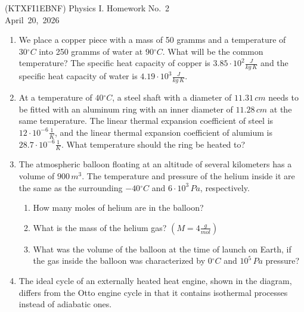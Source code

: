 \documentclass[a4paper,12pt]{letter}
\begin{document}
\begin{center}
 (KTXFI1EBNF) Physics I.  Homework No.~2\\ \smallskip
April~20,~2026
 \end{center}

\begin{enumerate}

\item We place a copper piece with a mass of 50 gramms and a temperature of $30{}^{\circ}C$ into 250 gramms of water at $90{}^{\circ}C$. What will be the common temperature? The specific heat capacity of copper is $3.85 \cdot 10^{2}\frac{J}{kg\,K}$ and the specific heat capacity of water is $4.19 \cdot 10^{3}\frac{J}{kg\,K}$.

\item At a temperature of $40{}^{\circ}C$, a steel shaft with a diameter of $11.31\,cm$ needs to be fitted with an aluminum ring with an inner diameter of $11.28\,cm$ at the same temperature. The linear thermal expansion coefficient of steel is $12 \cdot 10^{-6}\frac{1}{K}$, and the linear thermal expansion coefficient of alumium is $28.7 \cdot 10^{-6}\frac{1}{K}$. What temperature should the ring be heated to?


\item The atmospheric balloon floating at an altitude of several kilometers has a volume of $900\,m^{3}$. The temperature and pressure of the helium inside it are the same as the surrounding $-40{}^{\circ}C$ and $6 \cdot 10^{3}\,Pa$, respectively.
\begin{enumerate}
\item[(a)] How many moles of helium are in the balloon?
\item[(b)] What is the mass of the helium gas? $\left(M = 4 \frac{g}{mol}\right)$
\item[(c)] What was the volume of the balloon at the time of launch on Earth, if the gas inside the balloon was characterized by $0{}^{\circ}C$ and $10^{5}\,Pa$ pressure?
\end{enumerate}

\item The ideal cycle of an externally heated heat engine, shown in the diagram, differs from the Otto engine cycle in that it contains isothermal processes instead of adiabatic ones.

\begin{center}
\begin{tikzpicture}[
    arrow inside/.style={
        postaction={decorate},
        decoration={
            markings,
            mark=at position 0.55 with {\arrow{stealth}}
        }
    }
,scale=0.6]


\end{tikzpicture}
\end{center}
\end{enumerate}
\end{document}
